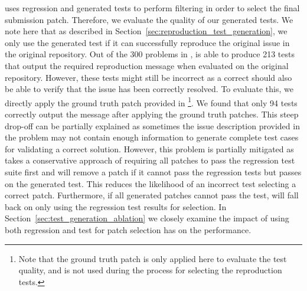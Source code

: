 \tech uses regression and generated \reproduction tests to perform filtering in order to select the final submission patch. 
Therefore, we evaluate the quality of our generated \reproduction tests. 
We note here that as described in Section~\ref{sec:reproduction_test_generation}, we only use the generated \reproduction test if it can successfully reproduce the original issue in the original repository. 
Out of the 300 problems in \swebenchlite, \tech is able to produce 213 \reproduction tests that output the required reproduction message when evaluated on the original repository.
However, these tests might still be incorrect as a correct \reproduction should also be able to verify that the issue has been correctly resolved.
To evaluate this, we directly apply the ground truth patch provided in \swebench\footnote{Note that the ground truth patch is only applied here to evaluate the test quality, and is not used during the \tech process for selecting the reproduction tests.}.
We found that only 94 tests correctly output the  message after applying the ground truth patches. 
This steep drop-off can be partially explained as sometimes the issue description provided in the problem may not contain enough information to generate complete test cases for validating a correct solution.
However, this problem is partially mitigated as \tech takes a conservative approach of requiring all patches to pass the regression test suite first and will remove a patch if it cannot pass the regression tests but passes on the generated \reproduction test. 
This reduces the likelihood of an incorrect \reproduction test selecting a correct patch. 
Furthermore, if all generated patches cannot pass the \reproduction test, \tech will fall back on only using the regression test results for selection.
In Section~\ref{sec:test_generation_ablation} we closely examine the impact of using both regression and \reproduction test for patch selection has on the performance.

